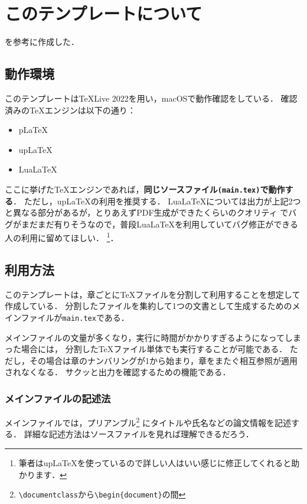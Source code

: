 \documentclass[main]{subfiles}
\begin{document}
\chapter{このテンプレートについて}

\cite{2017latex2ε美文書作成入門}を参考に作成した．

\section{動作環境}

このテンプレートはTeXLive 2022を用い，macOSで動作確認をしている．
確認済みの\TeX エンジンは以下の通り：
\begin{itemize}
  \item p\LaTeX
  \item up\LaTeX
  \item Lua\LaTeX
\end{itemize}

ここに挙げた\TeX エンジンであれば，\textbf{同じソースファイル\texttt{(main.tex)}で動作する}．
ただし，up\LaTeX の利用を推奨する．
Lua\LaTeX については出力が上記2つと異なる部分があるが，とりあえずPDF生成ができたくらいのクオリティ
でバグがまだまだ有りそうなので，普段Lua\LaTeX を利用していてバグ修正ができる人の利用に留めてほしい．
\footnote{筆者はup\LaTeX を使っているので詳しい人はいい感じに修正してくれると助かります．}．

\section{利用方法}

このテンプレートは，章ごとに\TeX ファイルを分割して利用することを想定して作成している．
分割したファイルを集約して1つの文書として生成するためのメインファイルが\texttt{main.tex}である．

メインファイルの文量が多くなり，実行に時間がかかりすぎるようになってしまった場合には，
分割した\TeX ファイル単体でも実行することが可能である．
ただし，その場合は章のナンバリングが1から始まり，章をまたぐ相互参照が適用されなくなる．
サクッと出力を確認するための機能である．

\subsection{メインファイルの記述法}

メインファイルでは，プリアンブル\footnote{\texttt{\textbackslash documentclass}から\texttt{\textbackslash begin\{document\}}の間}
にタイトルや氏名などの論文情報を記述する．
詳細な記述方法はソースファイルを見れば理解できるだろう．
\end{document}
